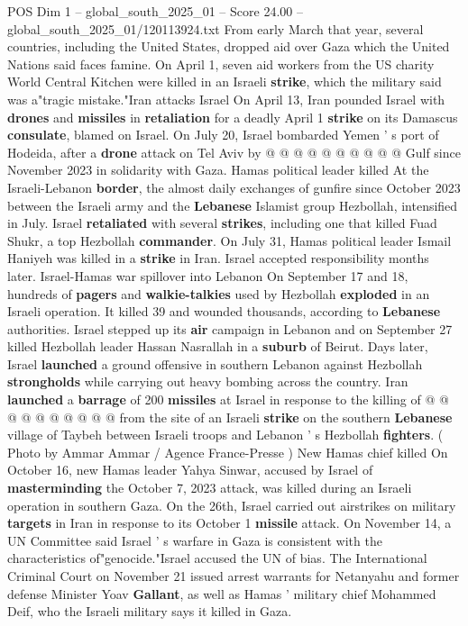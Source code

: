 \begin{textsample}{POS Dim 1 – global\_south\_2025\_01 – Score 24.00 – global\_south\_2025\_01/120113924.txt}
From early March that year, several countries, including the United States, dropped aid over Gaza which the United Nations said faces famine.
On April 1, seven aid workers from the US charity World Central Kitchen were killed in an Israeli \textbf{strike}, which the military said was a"tragic mistake."Iran attacks Israel On April 13, Iran pounded Israel with \textbf{drones} and \textbf{missiles} in \textbf{retaliation} for a deadly April 1 \textbf{strike} on its Damascus \textbf{consulate}, blamed on Israel.
On July 20, Israel bombarded Yemen ' s port of Hodeida, after a \textbf{drone} attack on Tel Aviv by @ @ @ @ @ @ @ @ @ @ Gulf since November 2023 in solidarity with Gaza.
Hamas political leader killed At the Israeli-Lebanon \textbf{border}, the almost daily exchanges of gunfire since October 2023 between the Israeli army and the \textbf{Lebanese} Islamist group Hezbollah, intensified in July.
Israel \textbf{retaliated} with several \textbf{strikes}, including one that killed Fuad Shukr, a top Hezbollah \textbf{commander}.
On July 31, Hamas political leader Ismail Haniyeh was killed in a \textbf{strike} in Iran.
Israel accepted responsibility months later.
Israel-Hamas war spillover into Lebanon On September 17 and 18, hundreds of \textbf{pagers} and \textbf{walkie-talkies} used by Hezbollah \textbf{exploded} in an Israeli operation.
It killed 39 and wounded thousands, according to \textbf{Lebanese} authorities.
Israel stepped up its \textbf{air} campaign in Lebanon and on September 27 killed Hezbollah leader Hassan Nasrallah in a \textbf{suburb} of Beirut.
Days later, Israel \textbf{launched} a ground offensive in southern Lebanon against Hezbollah \textbf{strongholds} while carrying out heavy bombing across the country.
Iran \textbf{launched} a \textbf{barrage} of 200 \textbf{missiles} at Israel in response to the killing of @ @ @ @ @ @ @ @ @ @ from the site of an Israeli \textbf{strike} on the southern \textbf{Lebanese} village of Taybeh between Israeli troops and Lebanon ' s Hezbollah \textbf{fighters}. ( Photo by Ammar Ammar / Agence France-Presse ) New Hamas chief killed On October 16, new Hamas leader Yahya Sinwar, accused by Israel of \textbf{masterminding} the October 7, 2023 attack, was killed during an Israeli operation in southern Gaza.
On the 26th, Israel carried out airstrikes on military \textbf{targets} in Iran in response to its October 1 \textbf{missile} attack.
On November 14, a UN Committee said Israel ' s warfare in Gaza is consistent with the characteristics of"genocide."Israel accused the UN of bias.
The International Criminal Court on November 21 issued arrest warrants for Netanyahu and former defense Minister Yoav \textbf{Gallant}, as well as Hamas ' military chief Mohammed Deif, who the Israeli military says it killed in Gaza.

\end{textsample}
